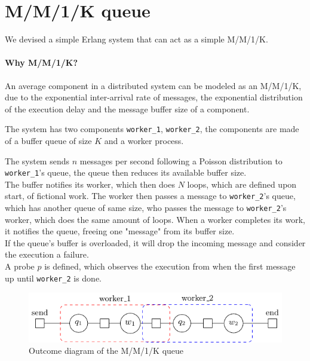 \section{M/M/1/K queue}
    We devised a simple Erlang system that can act as a simple M/M/1/K.
    \paragraph{Why M/M/1/K?} An average component in a distributed system can be modeled as an M/M/1/K, due to the exponential inter-arrival rate of messages, the exponential distribution of the execution delay and the message buffer size of a component.

    The system has two components \texttt{worker\_1}, \texttt{worker\_2}, the components are made of a buffer queue of size $K$ and a worker process.
    
    The system sends $n$ messages per second following a Poisson distribution to \texttt{worker\_1}'s queue, the queue then reduces its available buffer size. \\
    
    The buffer notifies its worker, which then does $N$ loops, which are defined upon start, of fictional work. The worker then passes a message to \texttt{worker\_2}'s queue, which has another queue of same size, who passes the message to \texttt{worker\_2}'s worker, which does the same amount of loops. When a worker completes its work, it notifies the queue, freeing one "message" from its buffer size. \\
    
    If the queue's buffer is overloaded, it will drop the incoming message and consider the execution a failure. \\
    
    A probe $p$ is defined, which observes the execution from when the first message up until \texttt{worker\_2} is done.
    \begin{figure}[H]
        \begin{center}
            \includegraphics[scale=1.2, width=\textwidth]{tikz/mm1k.pdf} 
        \end{center}
        \caption{Outcome diagram of the M/M/1/K queue}
    \end{figure}

